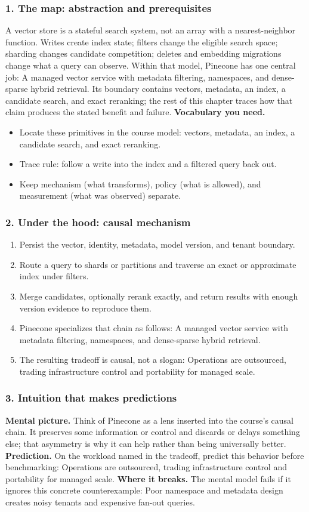 \subsubsection*{1. The map: abstraction and prerequisites}
A vector store is a stateful search system, not an array with a nearest-neighbor function. Writes create index state; filters change the eligible search space; sharding changes candidate competition; deletes and embedding migrations change what a query can observe.
Within that model, Pinecone has one central job: A managed vector service with metadata filtering, namespaces, and dense-sparse hybrid retrieval. Its boundary contains vectors, metadata, an index, a candidate search, and exact reranking; the rest of this chapter traces how that claim produces the stated benefit and failure.
\textbf{Vocabulary you need.}\begin{itemize}
\item Locate these primitives in the course model: vectors, metadata, an index, a candidate search, and exact reranking.
\item Trace rule: follow a write into the index and a filtered query back out.
\item Keep mechanism (what transforms), policy (what is allowed), and measurement (what was observed) separate.
\end{itemize}
\subsubsection*{2. Under the hood: causal mechanism}\begin{enumerate}
\item Persist the vector, identity, metadata, model version, and tenant boundary.
\item Route a query to shards or partitions and traverse an exact or approximate index under filters.
\item Merge candidates, optionally rerank exactly, and return results with enough version evidence to reproduce them.
\item Pinecone specializes that chain as follows: A managed vector service with metadata filtering, namespaces, and dense-sparse hybrid retrieval.
\item The resulting tradeoff is causal, not a slogan: Operations are outsourced, trading infrastructure control and portability for managed scale.
\end{enumerate}
\subsubsection*{3. Intuition that makes predictions}
\textbf{Mental picture.} Think of Pinecone as a lens inserted into the course's causal chain. It preserves some information or control and discards or delays something else; that asymmetry is why it can help rather than being universally better.
\textbf{Prediction.} On the workload named in the tradeoff, predict this behavior before benchmarking: Operations are outsourced, trading infrastructure control and portability for managed scale.
\textbf{Where it breaks.} The mental model fails if it ignores this concrete counterexample: Poor namespace and metadata design creates noisy tenants and expensive fan-out queries.
